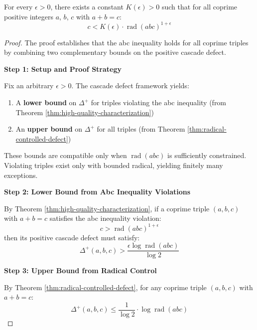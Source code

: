 \begin{theorem}
\label{thm:abc-theorem}
For every $\epsilon > 0$, there exists a constant $K(\epsilon) > 0$ such that for all coprime positive integers $a$, $b$, $c$ with $a + b = c$:
\begin{equation}
c < K(\epsilon) \cdot \operatorname{rad}(abc)^{1+\epsilon}
\end{equation}
\end{theorem}

\begin{proof}

The proof establishes that the abc inequality holds for all coprime triples by combining two complementary bounds on the positive cascade defect.

\noindent \textbf{Step 1: Setup and Proof Strategy}

Fix an arbitrary $\epsilon > 0$. The cascade defect framework yields:

\begin{enumerate}
\item A \textbf{lower bound} on $\Delta^{+}$ for triples violating the abc inequality (from Theorem \ref{thm:high-quality-characterization})
\item An \textbf{upper bound} on $\Delta^{+}$ for all triples (from Theorem \ref{thm:radical-controlled-defect})
\end{enumerate}

These bounds are compatible only when $\operatorname{rad}(abc)$ is sufficiently constrained. Violating triples exist only with bounded radical, yielding finitely many exceptions.

\noindent \textbf{Step 2: Lower Bound from Abc Inequality Violations}

By Theorem \ref{thm:high-quality-characterization}, if a coprime triple $(a,b,c)$ with $a+b=c$ satisfies the abc inequality violation:
\begin{equation}
c > \operatorname{rad}(abc)^{1+\epsilon}
\end{equation}
then its positive cascade defect must satisfy:
\begin{equation}
\label{eq:abc-defect-lower}
\Delta^{+}(a,b,c) > \frac{\epsilon \log \operatorname{rad}(abc)}{\log 2}
\end{equation}

\noindent \textbf{Step 3: Upper Bound from Radical Control}

By Theorem \ref{thm:radical-controlled-defect}, for any coprime triple $(a,b,c)$ with $a+b=c$:
\begin{equation}
\label{eq:abc-defect-upper}
\Delta^{+}(a,b,c) \leq \frac{1}{\log 2} \cdot \log \operatorname{rad}(abc)
\end{equation}


\end{proof}
